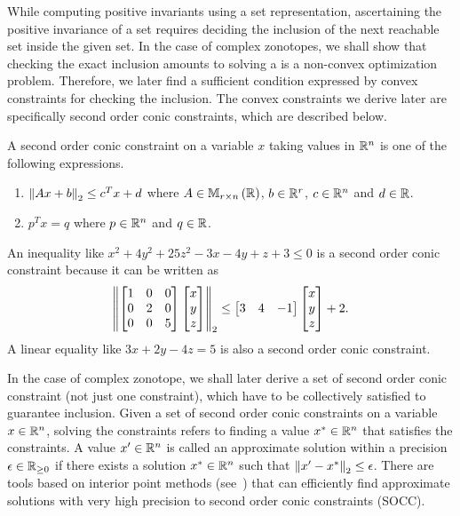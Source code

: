 While computing positive invariants using a set representation,
ascertaining the positive invariance of a set requires deciding the
inclusion of the next reachable set inside the given set.  In the case
of complex zonotopes, we shall show that checking the exact inclusion
amounts to solving a is a non-convex optimization problem.  Therefore,
we later find a sufficient condition expressed by convex constraints
for checking the inclusion.  The convex constraints we derive later
are specifically second order conic constraints, which are described
below.
%
\begin{definition}
A second order conic constraint on a variable $x$ taking values in
$\mathbb{R}^n$ is one of the following expressions.
\begin{enumerate}
\item $\left\|Ax+b\right\|_{2}\leq c^Tx+d$ where $A\in\mathbb{M}_{r\times n}\left(\mathbb{R}\right)$,
  $b\in\mathbb{R}^r$, $c\in\mathbb{R}^n$ and $d\in\mathbb{R}$.
\item $p^Tx=q$ where $p\in\mathbb{R}^n$ and $q\in\mathbb{R}$.
\end{enumerate}
\end{definition}
%
\begin{example}
%
An inequality like $x^2+4y^2+25z^2-3x-4y+z+3\leq 0$ is a second order
  conic constraint because it can be written as
%
\[
\left\|\left[\begin{matrix}
    1 & 0 & 0\\
    0 & 2 & 0\\
    0 & 0 & 5
\end{matrix}\right]\left[\begin{matrix}x\\y\\z\end{matrix}\right]\right\|_2\leq \left[\begin{matrix}3 & 4 & -1\end{matrix}\right]\left[\begin{matrix}x\\y\\z\end{matrix}\right]+2.
\]
A linear equality like $3x+2y-4z=5$ is also a second order conic
constraint.
\end{example}
%
In the case of complex zonotope, we shall later derive a set of second
order conic constraint (not just one constraint), which have to be
collectively satisfied to guarantee inclusion.  Given a set of second
order conic constraints on a variable $x\in\mathbb{R}^n$, solving the
constraints refers to finding a value $x^*\in\mathbb{R}^n$ that satisfies
the constraints.  A value $x^\prime\in\mathbb{R}^n$ is called an approximate
solution within a precision $\epsilon\in\mathbb{R}_{\geq 0}$ if there
exists a solution $x^*\in\mathbb{R}^n$ such that $\left\|x^\prime-x^*\right\|_{2}\leq
\epsilon$.  There are tools based on interior point methods
(see~\cite{grant2008cvx}) that can efficiently find approximate
solutions with very high precision to second order conic constraints
(SOCC).

